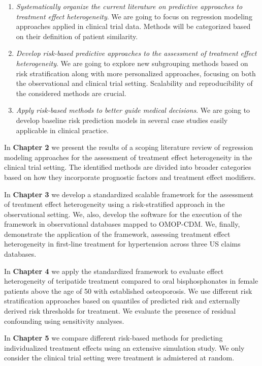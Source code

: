 \documentclass[
]{book}
\providecommand{\tightlist}{%
  \setlength{\itemsep}{0pt}\setlength{\parskip}{0pt}}
\begin{document}
\begin{enumerate}
\def\labelenumi{\arabic{enumi}.}
\tightlist
\item
  \emph{Systematically organize the current literature on predictive approaches to
  treatment effect heterogeneity}. We are going to focus on regression modeling
  approaches applied in clinical trial data. Methods will be categorized based
  on their definition of patient similarity.
\item
  \emph{Develop risk-based predictive approaches to the assessment of treatment
  effect heterogeneity}. We are going to explore new subgrouping methods based
  on risk stratification along with more personalized approaches, focusing on
  both the observational and clinical trial setting. Scalability and
  reproducibility of the considered methods are crucial.
\item
  \emph{Apply risk-based methods to better guide medical decisions}. We are going to
  develop baseline risk prediction models in several case studies easily
  applicable in clinical practice.
\end{enumerate}

In \textbf{Chapter 2} we present the results of a scoping literature review of
regression modeling approaches for the assessment of treatment effect
heterogeneity in the clinical trial setting. The identified methods are divided
into broader categories based on how they incorporate prognostic factors and
treatment effect modifiers.

In \textbf{Chapter 3} we develop a standardized scalable framework for the assessment
of treatment effect heterogeneity using a risk-stratified approach in the
observational setting. We, also, develop the software for the execution of the
framework in observational databases mapped to OMOP-CDM. We, finally,
demonstrate the application of the framework, assessing treatment effect
heterogeneity in first-line treatment for hypertension across three US claims
databases.

In \textbf{Chapter 4} we apply the standardized framework to evaluate effect
heterogeneity of teripatide treatment compared to oral bisphosphonates in female
patients above the age of 50 with established osteoporosis. We use different
risk stratification approaches based on quantiles of predicted risk and
externally derived risk thresholds for treatment. We evaluate the presence of
residual confounding using sensitivity analyses.

In \textbf{Chapter 5} we compare different risk-based methods for predicting
individualized treatment effects using an extensive simulation study. We only
consider the clinical trial setting were treatment is admistered at random.
\end{document}
